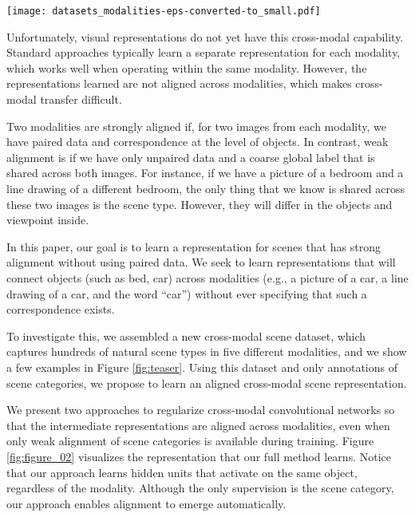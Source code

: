 \documentclass[10pt,journal,compsoc]{IEEEtran}
\begin{document}
    \begin{figure*}
\centering
\texttt{[image: datasets\_modalities-eps-converted-to\_small.pdf]}
\vspace{2em}
\label{fig:teaser}
    \end{figure*}
    
    Unfortunately, visual representations do not yet have this cross-modal capability. Standard approaches typically learn a separate representation for each modality,  which works well when operating within the same modality. However, the representations learned are not aligned across modalities, which makes cross-modal transfer difficult. 
    
    Two modalities are strongly aligned if, for two images from each modality, we have paired data and correspondence at the level of objects. In contrast, weak alignment is if we have only unpaired data and a coarse global label that is shared across both images. For instance, if we have a picture of a bedroom and a line drawing of a different bedroom, the only thing that we know is shared across these two images is the scene type. However, they will differ in the objects and viewpoint inside.
    
    In this paper, our goal is to learn a representation for scenes that has strong alignment without using paired data. We seek to learn representations that will connect objects (such as bed, car) across modalities (e.g., a picture of a car, a line drawing of a car, and the word ``car'') without ever specifying that such a correspondence exists.
    
    To investigate this, we assembled a new cross-modal scene dataset, which captures hundreds of natural scene types in five different modalities, and we show a few examples in Figure \ref{fig:teaser}. Using this dataset and only annotations of scene categories, we propose to learn an aligned cross-modal scene representation. 
    
    We present two approaches to regularize cross-modal convolutional networks so that the intermediate representations are aligned across modalities, even when only weak alignment of scene categories is available during training. Figure \ref{fig:figure_02} visualizes the representation that our full method learns. Notice that our approach learns hidden units that activate on the same object, regardless of the modality. Although the only supervision is the scene category, our approach enables alignment to emerge automatically.
    
\end{document}
